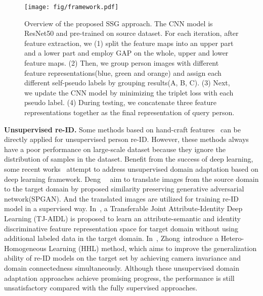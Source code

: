 \documentclass[10pt,twocolumn,letterpaper]{article}
\begin{document}
\begin{figure*}[t]
	\centering
	\texttt{[image: fig/framework.pdf]}
	\caption{Overview of the proposed SSG approach. The CNN model is ResNet50 and pre-trained on source dataset. For each iteration, after feature extraction, we (1) split the feature maps into an upper part and a lower part and employ GAP on the whole, upper and lower feature maps. (2) Then, we group person images with different feature representations(blue, green and orange) and assign each different self-pseudo labels by grouping results(A, B, C). (3) Next, we update the CNN model by minimizing the triplet loss with each pseudo label. (4) During testing, we concatenate three feature representations together as the final representation of query person.}
	\label{fig:framework}
	\vspace{-3mm}
\end{figure*}

{\bf Unsupervised re-ID.} Some methods based on hand-craft features~\cite{bazzani2013symmetry,gray2008viewpoint,liao2015person} can be directly applied for unsupervised person re-ID. However, these methods always have a poor performance on large-scale dataset because they ignore the distribution of samples in the dataset. Benefit from the success of deep learning, some recent works~\cite{deng2018image,peng2016unsupervised, wang2018transferable, wei2017person} attempt to address unsupervised domain adaptation based on deep learning framework. Deng~\etal~\cite{deng2018image} aim to translate images from the source domain to the target domain by proposed similarity preserving generative adversarial network(SPGAN). And the translated images are utilized for training re-ID model in a supervised way. In~\cite{wang2018transferable}, a Transferable Joint Attribute-Identity Deep Learning (TJ-AIDL) is proposed to learn an attribute-semantic and identity discriminative feature representation space for target domain without using additional labeled data in the target domain. In~\cite{zhong2018generalizing}, Zhong~\etal introduce a Hetero-Homogeneous Learning (HHL) method, which aims to improve the generalization ability of re-ID models on the target set by achieving camera invariance and domain connectedness simultaneously. Although these unsupervised domain adaptation approaches achieve promising progress, the performance is still unsatisfactory compared with the fully supervised approaches.
\end{document}
